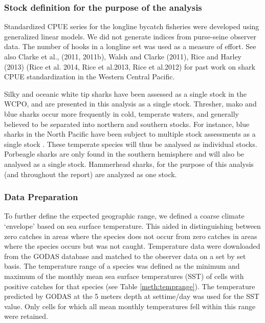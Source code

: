  \subsubsection{Stock definition for the purpose of the analysis}
   
Standardized CPUE series for the longline bycatch fisheries were developed using generalized linear models. We did not generate indices from purse-seine observer data. The number of hooks in a longline set was used as a measure of effort.
See also Clarke et al., (2011, 2011b),  Walsh and Clarke (2011), Rice and Harley (2013) (Rice et al. 2014, Rice et al.2013, Rice et al.2012)  for past work on shark CPUE standardization in the Western Central Pacific.
                                                                                       
Silky and oceanic white tip sharks have been assessed \citep{Rice2012_a, Rice2013_a} as a single stock in the WCPO, and are presented in this analysis as a single stock.  Thresher, mako and blue sharks occur more frequently in cold, temperate waters, and generally believed to be separated into northern and southern stocks. For instance, blue sharks in the North Pacific have been subject to multiple stock assessments as a single stock \citep{XXXX}. These temperate species will thus be analysed as individual stocks. Porbeagle sharks are only found in the southern hemisphere and will also be analysed as a single stock. Hammerhead sharks, for the purpose of this analysis (and throughout the report) are analyzed as one stock.

\subsubsection{Data Preparation}
To further define the expected geographic range, we defined a coarse climate `envelope' based on sea surface temperature. This aided in distinguishing between zero catches in areas where the species does not occur from zero catches in areas where the species occurs but was not caught. Temperature data were downloaded from the GODAS database \citep{GODASXXXX_a} and matched to the observer data on a set by set basis. The temperature range of a species was defined as the minimum and maximum of the monthly mean sea surface temperatures (SST) of cells with positive catches for that species (see Table \ref{meth:temprange}). The temperature predicted by GODAS at the 5 meters depth at settime/day was used for the SST value. Only cells for which all mean monthly temperatures fell within this range were retained. %
                                                                                       
